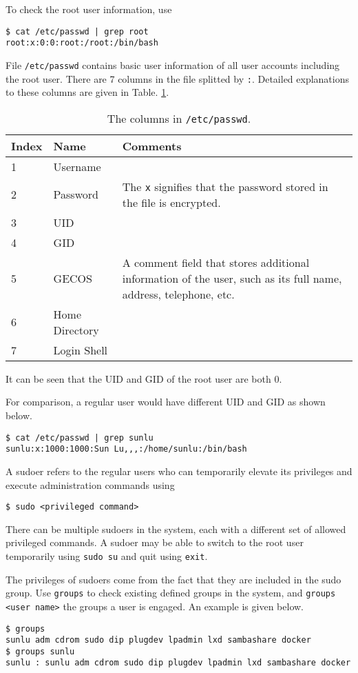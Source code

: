 To check the root user information, use
\begin{lstlisting}
$ cat /etc/passwd | grep root
root:x:0:0:root:/root:/bin/bash
\end{lstlisting}
File \verb|/etc/passwd| contains basic user information of all user accounts including the root user. There are 7 columns in the file splitted by \verb|:|. Detailed explanations to these columns are given in Table. \ref{tab:etcpasswd}.
\begin{table}[!htb]
  \centering \caption{The columns in \texttt{/etc/passwd}.}\label{tab:etcpasswd}
  \begin{tabularx}{\textwidth}{llX}
    \hline
    Index & Name & Comments \\ \hline
    1 & Username & \\ 
    2 & Password & The \verb|x| signifies that the password stored in the file is encrypted. \\ 
    3 & UID & \\
    4 & GID & \\
    5 & GECOS & A comment field that stores additional information of the user, such as its full name, address, telephone, etc. \\
    6 & Home Directory & \\
    7 & Login Shell & \\
    \hline
  \end{tabularx}
\end{table}
It can be seen that the UID and GID of the root user are both 0.

For comparison, a regular user would have different UID and GID as shown below.
\begin{lstlisting}
$ cat /etc/passwd | grep sunlu
sunlu:x:1000:1000:Sun Lu,,,:/home/sunlu:/bin/bash
\end{lstlisting}

A sudoer refers to the regular users who can temporarily elevate its privileges and execute administration commands using 
\begin{lstlisting}
$ sudo <privileged command>
\end{lstlisting}
There can be multiple sudoers in the system, each with a different set of allowed privileged commands. A sudoer may be able to switch to the root user temporarily using \verb|sudo su| and quit using \verb|exit|.

The privileges of sudoers come from the fact that they are included in the sudo group. Use \verb|groups| to check existing defined groups in the system, and \verb|groups <user name>| the groups a user is engaged. An example is given below.
\begin{lstlisting}
$ groups
sunlu adm cdrom sudo dip plugdev lpadmin lxd sambashare docker
$ groups sunlu
sunlu : sunlu adm cdrom sudo dip plugdev lpadmin lxd sambashare docker
\end{lstlisting}

